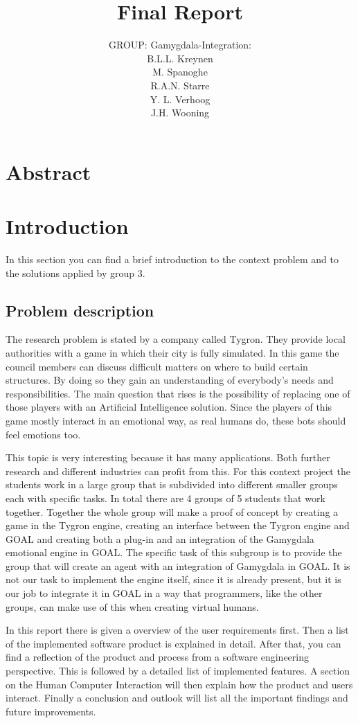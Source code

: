 \documentclass[]{article}
\title{Final Report}
\author{GROUP: Gamygdala-Integration:\\
	B.L.L. Kreynen\\
	M. Spanoghe\\
	R.A.N. Starre\\
	Y. L. Verhoog\\
	J.H. Wooning\\
	}
\begin{document}
\maketitle
\pagebreak
\tableofcontents
\pagebreak
\section{Abstract}

\section{Introduction}
In this section you can find a brief introduction to the context problem and to the solutions applied by group 3. 
\subsection{Problem description}
The research problem is stated by a company called Tygron. They provide local authorities with a game in which their city is fully simulated. In this game the council members can discuss difficult matters on where to build certain structures. By doing so they gain an understanding of everybody's needs and responsibilities. The main question that rises is the possibility of replacing one of those players with an Artificial Intelligence solution. Since the players of this game mostly interact in an emotional way, as real humans do, these bots should feel emotions too.\par 
This topic is very interesting because it has many applications. Both further research and different industries can profit from this. For this context project the students work in a large group that is subdivided into different smaller groups each with specific tasks. In total there are 4 groups of 5 students that work together. Together the whole group will make a proof of concept by creating a game in the Tygron engine\cite{Tygron}, creating an interface between the Tygron engine and \gls{GOAL} and creating both a plug-in and an integration of the \gls{Gamygdala} emotional engine in GOAL. The specific task of this subgroup is to provide the group that will create an agent with an integration of Gamygdala in GOAL. It is not our task to implement the engine itself, since it is already present, but it is our job to integrate it in GOAL in a way that programmers, like the other groups, can make use of this when creating virtual humans.\par 
In this report there is given a overview of the user requirements first. Then a list of the implemented software product is explained in detail. After that, you can find a reflection of the product and process from a software engineering perspective. This is followed by a detailed list of implemented features. A section on the Human Computer Interaction will then explain how the product and users interact. Finally a conclusion and outlook will list all the important findings and future improvements.
\\
\end{document}
